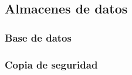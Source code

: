 \subsection{Almacenes de datos}

  \subsubsection{Base de datos}

  

  \subsubsection{Copia de seguridad}

  